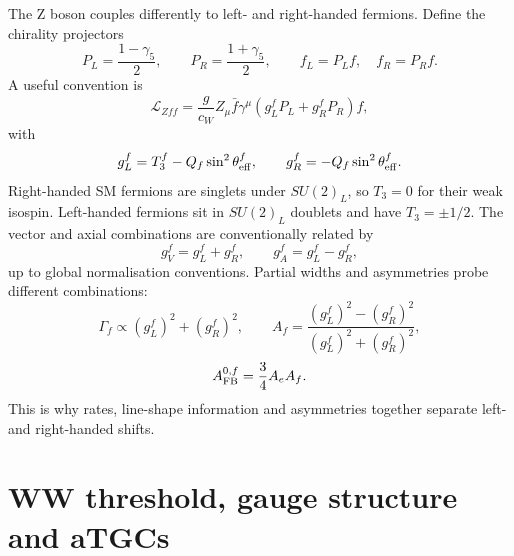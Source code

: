 \documentclass[11pt,a4paper]{report}
\begin{document}
The Z boson couples differently to left- and right-handed fermions.  Define the chirality projectors
\begin{equation}
  P_L=\frac{1-\gamma_5}{2},\qquad P_R=\frac{1+\gamma_5}{2},
  \qquad f_L=P_L f,\quad f_R=P_R f.
\end{equation}
A useful convention is
\begin{equation}
  \mathcal L_{Zff}=\frac{g}{c_W}Z_\mu\bar f\gamma^\mu
  \left(g_L^fP_L+g_R^fP_R\right)f,
\end{equation}
with
\begin{equation}
  g_L^f=T_3^f-Q_f\sin^2\theta_{\rm eff}^f,
  \qquad
  g_R^f=-Q_f\sin^2\theta_{\rm eff}^f.
\end{equation}
Right-handed SM fermions are singlets under $SU(2)_L$, so $T_3=0$ for their weak isospin.  Left-handed fermions sit in $SU(2)_L$ doublets and have $T_3=\pm 1/2$.  The vector and axial combinations are conventionally related by
\begin{equation}
  g_V^f=g_L^f+g_R^f,
  \qquad
  g_A^f=g_L^f-g_R^f,
\end{equation}
up to global normalisation conventions.  Partial widths and asymmetries probe different combinations:
\begin{equation}
  \Gamma_f\propto (g_L^f)^2+(g_R^f)^2,
  \qquad
  A_f=\frac{(g_L^f)^2-(g_R^f)^2}{(g_L^f)^2+(g_R^f)^2},
\end{equation}
\begin{equation}
  A_{\rm FB}^{0,f}=\frac{3}{4}A_eA_f.
\end{equation}
This is why rates, line-shape information and asymmetries together separate left- and right-handed shifts.


\section{WW threshold, gauge structure and aTGCs}
\end{document}
